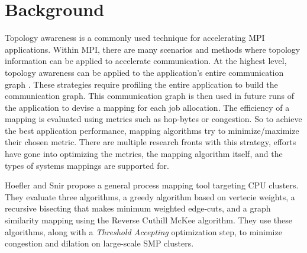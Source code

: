 

\section{Background}
Topology awareness is a commonly used technique for accelerating MPI applications. 
Within MPI, there are many scenarios and methods where topology information can be applied to accelerate communication.
At the highest level, topology awareness can be applied to the application's entire communication graph \cite{Hoefler2011GenericTopoMappingStrats, Mirsadeghi2016PTRAM, Faraji2016TopoAwareGPUSelection, Mirsadeghi2016MAGC, Galvez2017AutoTopoMap}.
These strategies require profiling the entire application to build the communication graph.
This communication graph is then used in future runs of the application to devise a mapping for each job allocation.
The efficiency of a mapping is evaluated using metrics such as hop-bytes or congestion.
So to achieve the best application performance, mapping algorithms try to minimize/maximize their chosen metric.
There are multiple research fronts with this strategy, efforts have gone into optimizing the metrics, the mapping algorithm itself, and the types of systems mappings are supported for.

Hoefler and Snir \cite{Hoefler2011GenericTopoMappingStrats} propose a general process mapping tool targeting CPU clusters.
They evaluate three algorithms, a greedy algorithm based on vertecie weights, a recursive bisecting that makes minimum weighted edge-cuts, and a graph similarity mapping using the Reverse Cuthill McKee algorithm. 
They use these algorithms, along with a \textit{Threshold Accepting} optimization step, to minimize congestion and dilation on large-scale SMP clusters.

